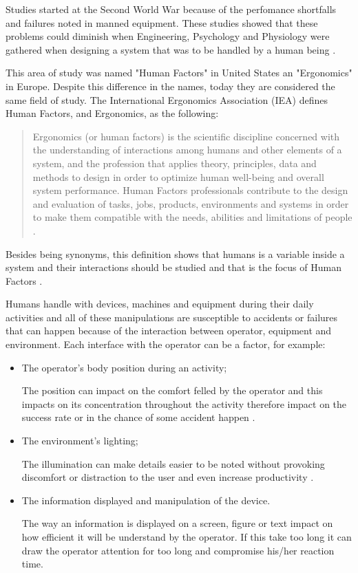 Studies started at the Second World War because of the perfomance shortfalls and failures noted in manned equipment. These studies showed that these problems could diminish when Engineering, Psychology and Physiology were gathered when designing a system that was to be handled by a human being \cite{sandom2004human}.

This area of study was named "Human Factors" in United States an "Ergonomics" in Europe. Despite this difference in the names, today they are considered the same field of study. The International Ergonomics Association (IEA) defines Human Factors, and Ergonomics, as the following:

\begin{quote}
    Ergonomics (or human factors) is the scientific discipline concerned with the understanding of interactions among humans and other elements of a system, and the profession that applies theory, principles, data and methods to design in order to optimize human well-being and overall system performance. Human Factors professionals contribute to the design and evaluation of tasks, jobs, products, environments and systems in order to make them compatible with the needs, abilities and limitations of people \cite{karwowski2012discipline}.
\end{quote}

Besides being synonyms, this definition shows that humans is a variable inside a system and their interactions should be studied and that is the focus of Human Factors \cite{sandom2004human, sanders1998human, dul2003ergonomics}. 

Humans handle with devices, machines and equipment during their daily activities and all of these manipulations are susceptible to accidents or failures that can happen because of the interaction between operator, equipment and environment. Each interface with the operator can be a factor, for example:

\begin{itemize}
    \item The operator's body position during an activity;
    
    The position can impact on the comfort felled by the operator and this impacts on its concentration throughout the activity therefore impact on the success rate or in the chance of some accident happen \cite{sanders1998human}.
    
    \item The environment's lighting;
    
    The illumination can make details easier to be noted without provoking discomfort or distraction to the user and even increase productivity \cite{sanders1998human}.
    
    \item The information displayed and manipulation of the device.
    
    The way an information is displayed on a screen, figure or text impact on how efficient it will be understand by the operator. If this take too long it can draw the operator attention for too long and compromise his/her reaction time.
    
\end{itemize}

